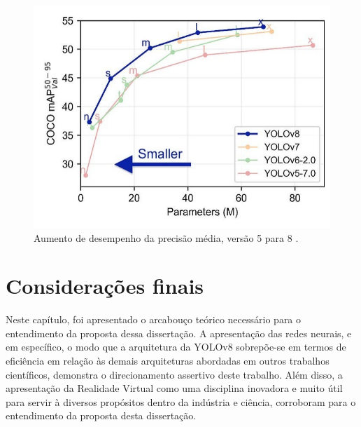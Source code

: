 \begin{figure}[!h]
    \center
    \begin{minipage}{0.9\linewidth}
    \center
    \captionsetup{justification=centering,margin=0.5cm,font=small}
    \includegraphics[width=0.7\linewidth]{img/cap2/precisao.png}
    \caption{ Aumento de desempenho da precisão média, versão 5 para 8 \cite{ultralytics2023yolo}.} 
    \label{fig:precisao}
    \end{minipage}
\end{figure}

\section{Considerações finais}

Neste capítulo, foi apresentado o arcabouço teórico necessário para o entendimento da proposta dessa dissertação. A apresentação das redes neurais, e em específico, o modo que a arquitetura da YOLOv8 sobrepõe-se em termos de eficiência em relação às demais arquiteturas abordadas em outros trabalhos científicos, demonstra o direcionamento assertivo deste trabalho. Além disso, a apresentação da Realidade Virtual como uma disciplina inovadora e muito útil para servir à diversos propósitos dentro da indústria e ciência, corroboram para o entendimento da proposta desta dissertação.





